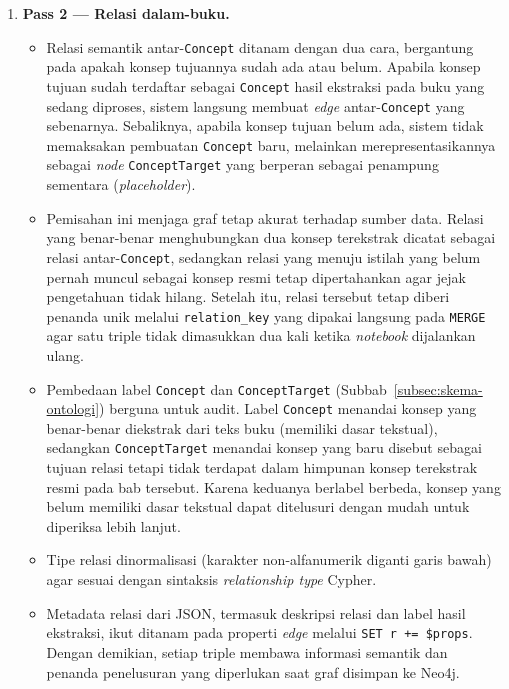 \documentclass[../../thesis]{subfiles}
\begin{document}
\begin{enumerate}
  \item \textbf{Pass 2 --- Relasi dalam-buku.}
  \begin{itemize}
    \item Relasi semantik antar-\texttt{Concept} ditanam dengan dua cara,
      bergantung pada apakah konsep tujuannya sudah ada atau belum. Apabila
      konsep tujuan sudah terdaftar sebagai \texttt{Concept} hasil ekstraksi
      pada buku yang sedang diproses, sistem langsung membuat \textit{edge}
      antar-\texttt{Concept} yang sebenarnya. Sebaliknya, apabila konsep tujuan
      belum ada, sistem tidak memaksakan pembuatan \texttt{Concept} baru,
      melainkan merepresentasikannya sebagai \textit{node} \texttt{ConceptTarget}
      yang berperan sebagai penampung sementara (\textit{placeholder}).
    \item Pemisahan ini menjaga graf tetap akurat terhadap sumber data. Relasi
      yang benar-benar menghubungkan dua konsep terekstrak dicatat sebagai
      relasi antar-\texttt{Concept}, sedangkan relasi yang menuju istilah yang
      belum pernah muncul sebagai konsep resmi tetap dipertahankan agar jejak
      pengetahuan tidak hilang. Setelah itu, relasi tersebut tetap diberi
      penanda unik melalui \texttt{relation\_key} yang dipakai langsung pada
      \texttt{MERGE} agar satu triple tidak dimasukkan dua kali ketika
      \textit{notebook} dijalankan ulang.
    \item Pembedaan label \texttt{Concept} dan \texttt{ConceptTarget}
      (Subbab~\ref{subsec:skema-ontologi}) berguna untuk audit. Label
      \texttt{Concept} menandai konsep yang benar-benar diekstrak dari teks buku
      (memiliki dasar tekstual), sedangkan \texttt{ConceptTarget} menandai konsep
      yang baru disebut sebagai tujuan relasi tetapi tidak terdapat dalam
      himpunan konsep terekstrak resmi pada bab tersebut. Karena keduanya
      berlabel berbeda, konsep yang belum memiliki
      dasar tekstual dapat ditelusuri dengan mudah untuk diperiksa lebih lanjut.
    \item Tipe relasi dinormalisasi (karakter non-alfanumerik diganti garis
      bawah) agar sesuai dengan sintaksis \textit{relationship type} Cypher.
    \item Metadata relasi dari JSON, termasuk deskripsi relasi dan label hasil
      ekstraksi, ikut ditanam pada properti \textit{edge} melalui
      \texttt{SET r += \$props}. Dengan demikian, setiap triple membawa
      informasi semantik dan penanda penelusuran yang diperlukan saat graf
      disimpan ke Neo4j.
  \end{itemize}


\end{enumerate}
\end{document}
